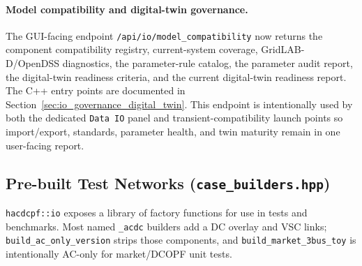 \paragraph{Model compatibility and digital-twin governance.}
The GUI-facing endpoint \texttt{/api/io/model\_compatibility} now returns the
component compatibility registry, current-system coverage, GridLAB-D/OpenDSS
diagnostics, the parameter-rule catalog, the parameter audit report, the
digital-twin readiness criteria, and the current digital-twin readiness report.
The C++ entry points are documented in
Section~\ref{sec:io_governance_digital_twin}.  This endpoint is intentionally
used by both the dedicated \texttt{Data IO} panel and transient-compatibility
launch points so import/export, standards, parameter health, and twin maturity
remain in one user-facing report.

\subsection{Pre-built Test Networks (\texttt{case\_builders.hpp})}
\label{sec:case-builders}

\texttt{hacdcpf::io} exposes a library of factory functions for use in tests
and benchmarks.  Most named \texttt{\_acdc} builders add a DC overlay and VSC
links; \texttt{build\_ac\_only\_version} strips those components, and
\texttt{build\_market\_3bus\_toy} is intentionally AC-only for market/DCOPF
unit tests.

